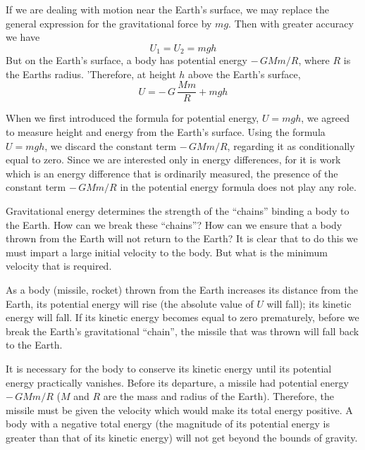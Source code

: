 If we are dealing with motion near the Earth's surface,
we may replace the general expression for the gravitational force by $mg$. Then with greater accuracy we have
 \begin{equation*}%
U_{1} = U_{2} =mgh
 \end{equation*}
But on the Earth's surface, a body has potential energy
$- \, GMm/R$, where $R$ is the Earths radius. 'Therefore,
at height $h$ above the Earth's surface,
 \begin{equation*}%
U = - \, G \, \dfrac{Mm}{R} +  mgh
 \end{equation*}
 
 When we first introduced the formula for potential
energy, $U = mgh$, we agreed to measure height and
energy from the Earth's surface. Using the formula
$U = mgh$, we discard the constant term $- \, GMm/R$,
regarding it as conditionally equal to zero. Since we are
interested only in energy differences, for it is work which
is an energy difference that is ordinarily measured, the
presence of the constant term $- \, GMm/R$ in the potential
energy formula does not play any role.

Gravitational energy determines the strength of the
``chains'' binding a body to the Earth. How can we break
these ``chains''? How can we ensure that a body thrown
from the Earth will not return to the Earth? It is clear
that to do this we must impart a large initial velocity
to the body. But what is the minimum velocity that is
required.

As a body (missile, rocket) thrown from the Earth
increases its distance from the Earth, its potential energy
will rise (the absolute value of $U$ will fall); its kinetic
energy will fall. If its kinetic energy becomes equal to
zero prematurely, before we break the Earth's gravitational ``chain'', the missile that was thrown will fall
back to the Earth.

It is necessary for the body to conserve its kinetic
energy until its potential energy practically vanishes.
Before its departure, a missile had potential energy
$- \,GMm/R$ ($M$ and $R$ are the mass and radius of the
Earth). Therefore, the missile must be given the velocity
which would make its total energy positive. A body with
a negative total energy (the magnitude of its potential
energy is greater than that of its kinetic energy) will
not get beyond the bounds of gravity.

